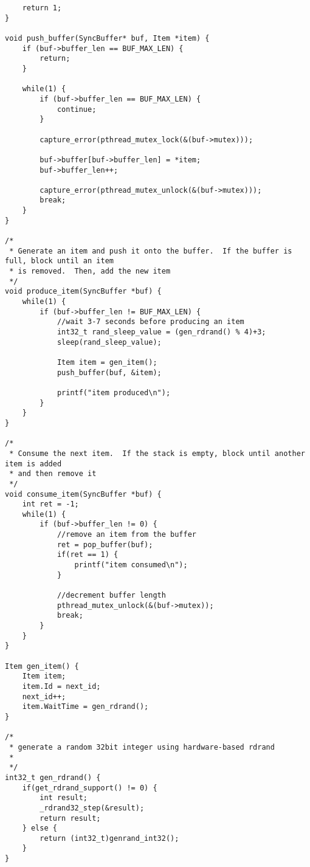 \documentclass[letterpaper,10pt]{article}
\begin{document}
\begin{lstlisting}
	return 1;
}

void push_buffer(SyncBuffer* buf, Item *item) {
	if (buf->buffer_len == BUF_MAX_LEN) {
		return;
	}

	while(1) {
		if (buf->buffer_len == BUF_MAX_LEN) {
			continue;
		}

		capture_error(pthread_mutex_lock(&(buf->mutex)));
		
		buf->buffer[buf->buffer_len] = *item;
		buf->buffer_len++;

		capture_error(pthread_mutex_unlock(&(buf->mutex)));
		break;
	}
}

/*
 * Generate an item and push it onto the buffer.  If the buffer is full, block until an item
 * is removed.  Then, add the new item
 */
void produce_item(SyncBuffer *buf) {
	while(1) {
		if (buf->buffer_len != BUF_MAX_LEN) {
			//wait 3-7 seconds before producing an item
			int32_t rand_sleep_value = (gen_rdrand() % 4)+3;
			sleep(rand_sleep_value);

			Item item = gen_item();
			push_buffer(buf, &item);

			printf("item produced\n");
		}
	}
}

/*
 * Consume the next item.  If the stack is empty, block until another item is added
 * and then remove it
 */
void consume_item(SyncBuffer *buf) {
	int ret = -1;
	while(1) {
		if (buf->buffer_len != 0) {
			//remove an item from the buffer
			ret = pop_buffer(buf);
			if(ret == 1) {
				printf("item consumed\n");
			}

			//decrement buffer length
			pthread_mutex_unlock(&(buf->mutex));
			break;
		}
	}
}

Item gen_item() {
	Item item;
	item.Id = next_id;
	next_id++;
	item.WaitTime = gen_rdrand();
}

/*
 * generate a random 32bit integer using hardware-based rdrand
 *
 */
int32_t gen_rdrand() {
	if(get_rdrand_support() != 0) {
		int result;
		_rdrand32_step(&result);
		return result;
	} else {
		return (int32_t)genrand_int32();
	}
}
\end{lstlisting}
\end{document}
